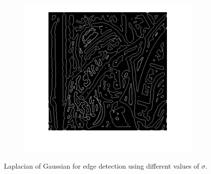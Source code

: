 \documentclass{article}
\begin{document}
\begin{figure}
\begin{subfigure}[b]{0.32\textwidth}
        \end{subfigure}
        \begin{subfigure}[b]{0.32\textwidth}
            \includegraphics[width=\textwidth]{Images/lena_log_5.png}
        \end{subfigure}
        \caption{Laplacian of Gaussian for edge detection using different values of $\sigma$.}
        \label{fig:log}
\end{figure}
\end{document}
